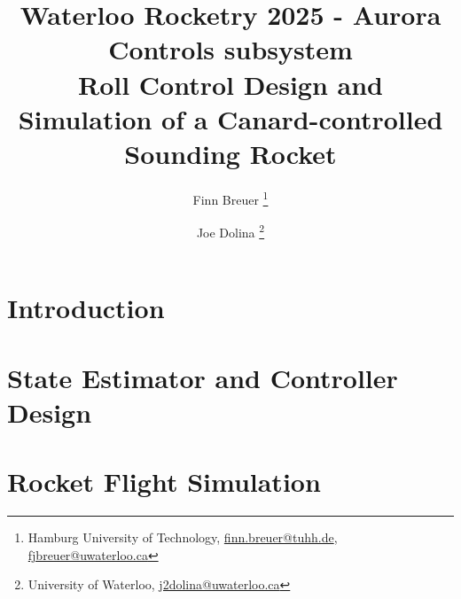 \documentclass[a4paper, 12pt]{report}
\begin{document}

\title{
{\Large Waterloo Rocketry 2025 - Aurora} \\[0.3em]
{\Large Controls subsystem
} \\[1em]
\Huge \bfseries
{Roll Control Design and Simulation of a Canard-controlled Sounding Rocket}
}
\author{
Finn Breuer \footnote{Hamburg University of Technology, \href{mailto:finn.breuer@tuhh.de}{finn.breuer@tuhh.de},  \href{mailto:fjbreuer@uwaterloo.ca}{fjbreuer@uwaterloo.ca}} 
\and 
Joe Dolina \footnote{University of Waterloo, \href{mailto:j2dolina@uwaterloo.ca}{j2dolina@uwaterloo.ca}}
}
\maketitle 


\tableofcontents
\addtocounter{page}{1}

\newpage
{}
\pagestyle{fancy}

\chapter*{Introduction}



\chapter[Estimator \& Controller]{State Estimator and Controller Design}


\newpage

\newpage


%
\newpage


\chapter[Flight Simulation]{Rocket Flight Simulation}


\newpage


\newpage

\fancyfoot[R]{}
\printbibliography[heading=bibintoc, title={References}]
\end{document}
